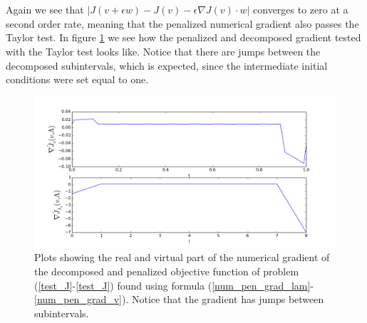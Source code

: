 \\
\\
Again we see that $|J(v+\epsilon w)-J(v)-\epsilon \nabla J(v)\cdot w|$ converges to zero at a second order rate, meaning that the penalized numerical gradient also passes the Taylor test. In figure \ref{JGrad2} we see how the penalized and decomposed gradient tested with the Taylor test looks like. Notice that there are jumps between the decomposed subintervals, which is expected, since the intermediate initial conditions were set equal to one.
\begin{figure}[!h]
\centering
\includegraphics[scale=0.5]{pen_num_grad.png}
\caption{Plots showing the real and virtual part of the numerical gradient of the decomposed and penalized objective function of problem (\ref{test_J}-\ref{test_J}) found using formula (\ref{num_pen_grad_lam}-\ref{num_pen_grad_v}). Notice that the gradient has jumps between subintervals.}
\label{JGrad2}
\end{figure}
